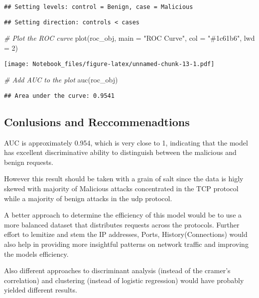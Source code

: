 \documentclass[
]{article}
\newenvironment{Shaded}{\begin{snugshade}}{\end{snugshade}}
\newcommand{\AttributeTok}[1]{\textcolor[rgb]{0.77,0.63,0.00}{#1}}
\newcommand{\CommentTok}[1]{\textcolor[rgb]{0.56,0.35,0.01}{\textit{#1}}}
\newcommand{\DecValTok}[1]{\textcolor[rgb]{0.00,0.00,0.81}{#1}}
\newcommand{\FunctionTok}[1]{\textcolor[rgb]{0.00,0.00,0.00}{#1}}
\newcommand{\NormalTok}[1]{#1}
\newcommand{\StringTok}[1]{\textcolor[rgb]{0.31,0.60,0.02}{#1}}
\begin{document}
\begin{verbatim}
## Setting levels: control = Benign, case = Malicious
\end{verbatim}

\begin{verbatim}
## Setting direction: controls < cases
\end{verbatim}

\begin{Shaded}
\begin{Highlighting}[]
\CommentTok{\# Plot the ROC curve}
\FunctionTok{plot}\NormalTok{(roc\_obj, }\AttributeTok{main =} \StringTok{"ROC Curve"}\NormalTok{, }\AttributeTok{col =} \StringTok{"\#1c61b6"}\NormalTok{, }\AttributeTok{lwd =} \DecValTok{2}\NormalTok{)}
\end{Highlighting}
\end{Shaded}

\texttt{[image: Notebook\_files/figure-latex/unnamed-chunk-13-1.pdf]}

\begin{Shaded}
\begin{Highlighting}[]
\CommentTok{\# Add AUC to the plot}
\FunctionTok{auc}\NormalTok{(roc\_obj)}
\end{Highlighting}
\end{Shaded}

\begin{verbatim}
## Area under the curve: 0.9541
\end{verbatim}

\hypertarget{conlusions-and-reccommenadtions}{%
\subsection{Conlusions and
Reccommenadtions}\label{conlusions-and-reccommenadtions}}

AUC is approximately 0.954, which is very close to 1, indicating that
the model has excellent discriminative ability to distinguish between
the malicious and benign requests.

However this result should be taken with a grain of salt since the data
is higly skewed with majority of Malicious attacks concentrated in the
TCP protocol while a majority of benign attacks in the udp protocol.

A better approach to determine the efficiency of this model would be to
use a more balanced dataset that distributes requests across the
protocols. Further effort to lemitize and stem the IP addresses, Ports,
History(Connections) would also help in providing more insightful
patterns on network traffic and improving the models efficiency.

Also different approaches to discriminant analysis (instead of the
cramer's correlation) and clustering (instead of logistic regression)
would have probably yielded different results.
\end{document}
